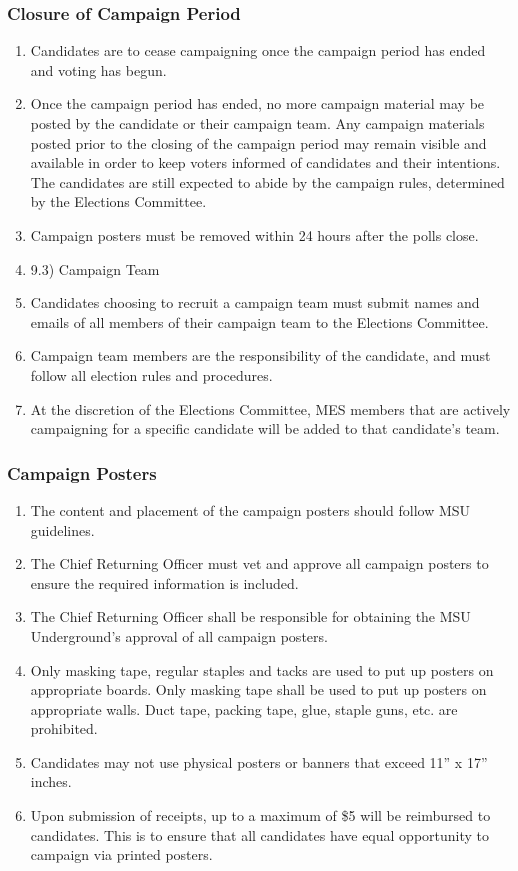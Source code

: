 \hypertarget{closure-of-campaign-period}{%
 \subsubsection{Closure of Campaign Period}
 \label{closure-of-campaign-period}}
\begin{enumerate}
 \item
  Candidates are to cease campaigning once the campaign period has ended
  and voting has begun.
 \item
  Once the campaign period has ended, no more campaign material may be
  posted by the candidate or their campaign team. Any campaign materials
  posted prior to the closing of the campaign period may remain visible
  and available in order to keep voters informed of candidates and their
  intentions. The candidates are still expected to abide by the campaign
  rules, determined by the Elections Committee.
 \item
  Campaign posters must be removed within 24 hours after the polls
  close.
 \item
  9.3) Campaign Team
 \item
  Candidates choosing to recruit a campaign team must submit names and
  emails of all members of their campaign team to the Elections
  Committee.
 \item
  Campaign team members are the responsibility of the candidate, and
  must follow all election rules and procedures.
 \item
  At the discretion of the Elections Committee, MES members that are
  actively campaigning for a specific candidate will be added to that
  candidate's team.

\end{enumerate}

\hypertarget{campaign-posters}{%
 \subsubsection{Campaign Posters}
 \label{campaign-posters}}
\begin{enumerate}
 \item
  The content and placement of the campaign posters should follow MSU
  guidelines.
 \item
  The Chief Returning Officer must vet and approve all campaign posters
  to ensure the required information is included.
 \item
  The Chief Returning Officer shall be responsible for obtaining the MSU
  Underground's approval of all campaign posters.
 \item
  Only masking tape, regular staples and tacks are used to put up
  posters on appropriate boards. Only masking tape shall be used to put
  up posters on appropriate walls. Duct tape, packing tape, glue, staple
  guns, etc. are prohibited.
 \item
  Candidates may not use physical posters or banners that exceed 11'' x
  17'' inches.
 \item
  Upon submission of receipts, up to a maximum of \$5 will be reimbursed
  to candidates. This is to ensure that all candidates have equal
  opportunity to campaign via printed posters.
\end{enumerate}

